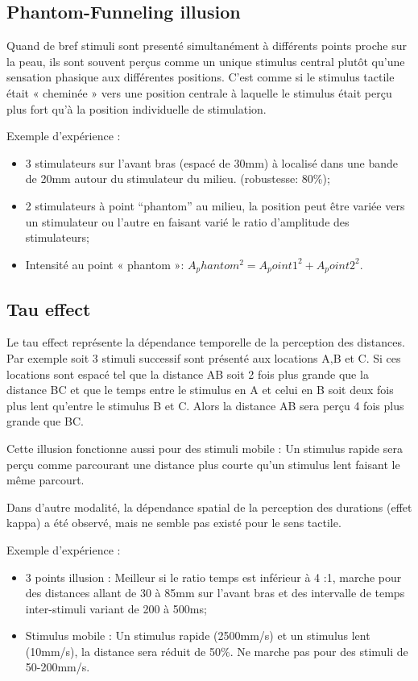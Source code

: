 \subsection{Phantom-Funneling illusion}
Quand de bref stimuli sont presenté simultanément à différents points proche sur la peau, ils sont souvent perçus comme un unique stimulus central plutôt qu’une sensation phasique aux différentes positions. C’est comme si le stimulus tactile était « cheminée » vers une position centrale à laquelle le stimulus était perçu plus fort qu’à la position individuelle de stimulation.\par
Exemple d’expérience :
\begin{itemize}
	\item 3 stimulateurs sur l’avant bras (espacé de 30mm) à localisé dans une bande de 20mm autour du stimulateur du milieu. (robustesse: 80\%);
	\item 2 stimulateurs à point “phantom” au milieu, la position peut être variée vers un stimulateur ou l’autre en faisant varié le ratio d’amplitude des stimulateurs;
	\item Intensité au point « phantom »: $A_phantom^2= A_point1^2+A_point2^2$.
\end{itemize}

\subsection{Tau effect}
Le tau effect représente la dépendance temporelle de la perception des distances. Par exemple soit 3 stimuli successif sont présenté aux locations A,B et C. Si ces locations sont espacé tel que la distance AB soit 2 fois plus grande que la distance BC et que le temps entre le stimulus en A et celui en B soit deux fois plus lent qu’entre le stimulus B et C. Alors la distance AB sera perçu 4 fois plus grande que BC.\par
Cette illusion fonctionne aussi pour des stimuli mobile : Un stimulus rapide sera perçu comme parcourant une distance plus courte qu’un stimulus lent faisant le même parcourt.\par
Dans d’autre modalité, la dépendance spatial de la perception des durations (effet kappa) a été observé, mais ne semble pas existé pour le sens tactile.\par
Exemple d’expérience :
\begin{itemize}
	\item 3 points illusion : Meilleur si le ratio temps est inférieur à 4 :1, marche pour des distances allant de 30 à 85mm sur l’avant bras et des intervalle de temps inter-stimuli variant de 200 à 500ms;
	\item Stimulus mobile : Un stimulus rapide (2500mm/s) et un stimulus lent (10mm/s), la distance sera réduit de 50\%. Ne marche pas pour des stimuli de 50-200mm/s.
\end{itemize}



